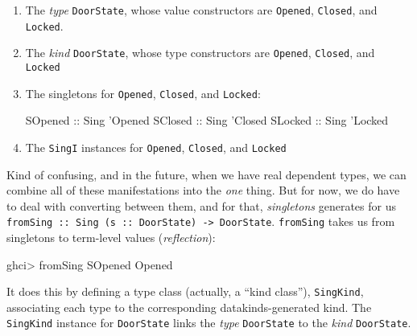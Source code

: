\documentclass[]{article}
\newenvironment{Shaded}{}{}
\newcommand{\DataTypeTok}[1]{\textcolor[rgb]{0.56,0.13,0.00}{#1}}
\newcommand{\FunctionTok}[1]{\textcolor[rgb]{0.02,0.16,0.49}{#1}}
\newcommand{\NormalTok}[1]{#1}
\newcommand{\OtherTok}[1]{\textcolor[rgb]{0.00,0.44,0.13}{#1}}
\begin{document}
\begin{enumerate}
\def\labelenumi{\arabic{enumi}.}
\item
  The \emph{type} \texttt{DoorState}, whose value constructors are
  \texttt{Opened}, \texttt{Closed}, and \texttt{Locked}.
\item
  The \emph{kind} \texttt{DoorState}, whose type constructors are
  \texttt{\textquotesingle{}Opened}, \texttt{\textquotesingle{}Closed}, and
  \texttt{\textquotesingle{}Locked}
\item
  The singletons for \texttt{\textquotesingle{}Opened},
  \texttt{\textquotesingle{}Closed}, and \texttt{\textquotesingle{}Locked}:

\begin{Shaded}
\begin{Highlighting}[]
\DataTypeTok{SOpened}\OtherTok{ ::} \DataTypeTok{Sing}\NormalTok{ '}\DataTypeTok{Opened}
\DataTypeTok{SClosed}\OtherTok{ ::} \DataTypeTok{Sing}\NormalTok{ '}\DataTypeTok{Closed}
\DataTypeTok{SLocked}\OtherTok{ ::} \DataTypeTok{Sing}\NormalTok{ '}\DataTypeTok{Locked}
\end{Highlighting}
\end{Shaded}
\item
  The \texttt{SingI} instances for \texttt{\textquotesingle{}Opened},
  \texttt{\textquotesingle{}Closed}, and
  \texttt{\textquotesingle{}Locked\textquotesingle{}}
\end{enumerate}

Kind of confusing, and in the future, when we have real dependent types, we can
combine all of these manifestations into the \emph{one} thing. But for now, we
do have to deal with converting between them, and for that, \emph{singletons}
generates for us
\texttt{fromSing\ ::\ Sing\ (s\ ::\ DoorState)\ -\textgreater{}\ DoorState}.
\texttt{fromSing} takes us from singletons to term-level values
(\emph{reflection}):

\begin{Shaded}
\begin{Highlighting}[]
\NormalTok{ghci}\FunctionTok{>}\NormalTok{ fromSing }\DataTypeTok{SOpened}
\DataTypeTok{Opened}
\end{Highlighting}
\end{Shaded}

It does this by defining a type class (actually, a ``kind class''),
\texttt{SingKind}, associating each type to the corresponding
datakinds-generated kind. The \texttt{SingKind} instance for \texttt{DoorState}
links the \emph{type} \texttt{DoorState} to the \emph{kind} \texttt{DoorState}.
\end{document}
